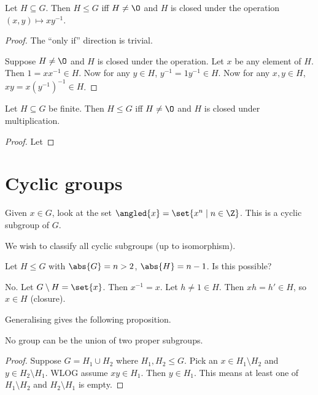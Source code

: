 \begin{proposition*}
    Let $H \subseteq G$.
    Then $H \le G$ iff $H \ne \O$ and $H$ is closed under the operation
    $(x, y) \mapsto xy^{-1}$.
\end{proposition*}
\begin{proof}
    The ``only if'' direction is trivial.

    Suppose $H \ne \O$ and $H$ is closed under the operation.
    Let $x$ be any element of $H$.
    Then $1 = xx^{-1} \in H$.
    Now for any $y \in H$, $y^{-1} = 1y^{-1} \in H$.
    Now for any $x, y \in H$, $xy = x(y^{-1})^{-1} \in H$.
\end{proof}

\begin{proposition}
    Let $H \subseteq G$ be finite.
    Then $H \le G$ iff $H \ne \O$ and $H$ is closed under multiplication.
\end{proposition}
\begin{proof}
    Let %
\end{proof}

\section{Cyclic groups} \label{sec:group:cyclic}
Given $x \in G$, look at the set $\angled{x} = \set{x^n \mid n \in \Z}$.
This is a cyclic subgroup of $G$.

We wish to classify all cyclic subgroups (up to isomorphism).

\begin{example}
    Let $H \le G$ with $\abs{G} = n > 2$, $\abs{H} = n-1$.
    Is this possible?

    No. Let $G \setminus H = \set{x}$.
    Then $x^{-1} = x$.
    Let $h \ne 1 \in H$.
    Then $xh = h' \in H$, so $x \in H$ (closure).
\end{example}

Generalising gives the following proposition.
\begin{proposition}
    No group can be the union of two proper subgroups.
\end{proposition}
\begin{proof}
    Suppose $G = H_1 \cup H_2$ where $H_1, H_2 \le G$.
    Pick an $x \in H_1 \setminus H_2$ and $y \in H_2 \setminus H_1$.
    WLOG assume $xy \in H_1$.
    Then $y \in H_1$.
    This means at least one of $H_1 \setminus H_2$ and $H_2 \setminus H_1$
    is empty.
\end{proof}


